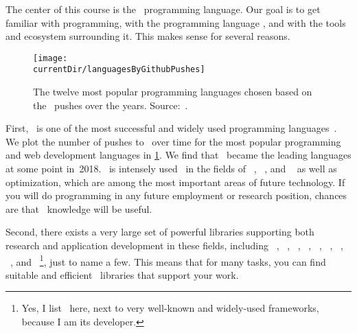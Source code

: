 %
%
The center of this course is the \python\ programming language.
Our goal is to get familiar with programming, with the programming language \python, and with the tools and ecosystem surrounding it.
This makes sense for several reasons.%
%
\begin{figure}%
\centering%
\texttt{[image: \\currentDir/languagesByGithubPushes]}%
\caption{The twelve most popular programming languages chosen based on the \github\ pushes over the years. Source:~\cite{B2023G2GLS}.}%
\label{fig:languagesByGithubPushes}%
\end{figure}%

First, \python\ is one of the most successful and widely used programming languages~\cite{CBST2024LOHPPTDDSAMLA}.
We plot the number of pushes to \github\ over time for the most popular programming and web development languages in \cref{fig:languagesByGithubPushes}.
We find that \python\ became the leading languages at some point in~2018.
\python\ is intensely used~\cite{CBST2024LOHPPTDDSAMLA} in the fields of ~\cite{RN2022AIAMA}, ~\cite{SSBD2014UMLFTTA}, and ~\cite{G2019DSFSFPWP} as well as optimization, which are among the most important areas of future technology.
If you will do programming in any future employment or research position, chances are that \python\ knowledge will be useful.

Second, there exists a very large set of powerful libraries supporting both research and application development in these fields, including \numpy~\cite{HMvdWGVCWTBSKPHvKBHFdRWPGMSRWAGO2020APWN,DBvR2024ITN,J2018NPSCADSAWNSAM}, \pandas~\cite{B2012DPWP,L2024PW}, \scikitlearn~\cite{PVGMTGBPWDVPCBPD2011SMLIP,RLM2022MLWPAS}, \scipy~\cite{VGOHRCBPWBvdWBWMMNJKLCPFMVLPCHQHARPvMS2020SFAFSCIP,J2018NPSCADSAWNSAM}, \tensorflow~\cite{ABCCDDDGIIKLMMMSTVWWYZ2016TASFLSML,L2023TDDBTADMLMWT}, \pytorch~\cite{PGMLBCKLGADKYDRTCSFBC2019PAISHPDLL,RLM2022MLWPAS}, \matplotlib~\cite{H2007MA2GE,P2021HOMLPAVWP,J2018NPSCADSAWNSAM}, \simpy~\cite{Z2024DESIEWS}, and \moptipy~\cite{WW2023RSDEWASSAA}\footnote{Yes, I list \moptipy\ here, next to very well-known and widely-used frameworks, because I am its developer.}, just to name a few.
This means that for many tasks, you can find suitable and efficient \python\ libraries that support your work.


